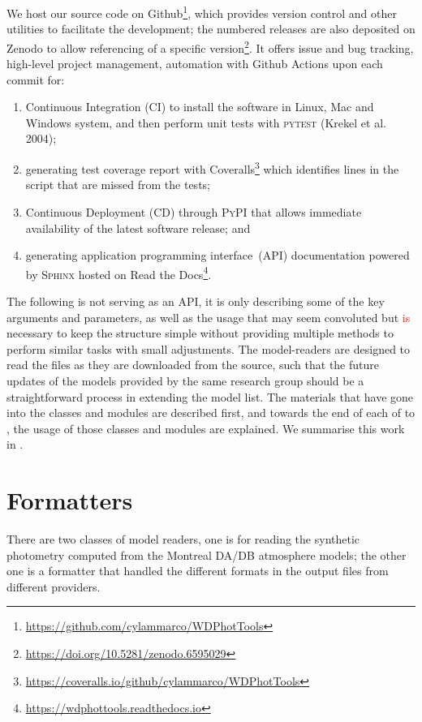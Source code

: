 \documentclass[fleqn,usenatbib]{rasti}
\begin{document}
We host our source code on Github\footnote{\url{https://github.com/cylammarco/WDPhotTools}},
which provides version control and other utilities to facilitate the
development; the numbered releases are also deposited on Zenodo to allow
referencing of a specific version\footnote{\url{https://doi.org/10.5281/zenodo.6595029}}. It offers issue and bug tracking, high-level project management,
automation with Github Actions upon each commit for:

\begin{enumerate}
    \item Continuous Integration (CI) to install the software in Linux, Mac
    and Windows system, and then perform unit tests with \textsc{pytest}
    (Krekel et al. 2004);
    \item generating test coverage report with Coveralls\footnote{\url{
    https://coveralls.io/github/cylammarco/WDPhotTools}}
    which identifies
    lines in the script that are missed from the tests;
    \item Continuous Deployment (CD) through \textsc{PyPI} that allows
    immediate availability of the latest software release; and
    \item generating application programming interface~(API) documentation
    powered by \textsc{Sphinx} hosted on
    Read the Docs\footnote{\url{https://wdphottools.readthedocs.io}}.
\end{enumerate}


The following is not serving as an API, it is only describing some of the key
arguments and parameters, as well as the usage that may seem convoluted but
\textcolor{red}{is} necessary to keep the structure simple without providing multiple methods to
perform similar tasks with small adjustments. The model-readers are designed
to read the files as they are downloaded from the source, such that the future
updates of the models provided by the same research group should be a
straightforward process in extending the model list. The materials that have
gone into the classes and modules are described first, and towards the end of
each of  to , the usage of those classes and modules
are explained. We summarise this work in .

\section{Formatters}
There are two classes of model readers, one is for reading the synthetic
photometry computed from the Montreal DA/DB atmosphere models; the other one is
a formatter that handled the different formats in the output files from
different providers.
\end{document}

